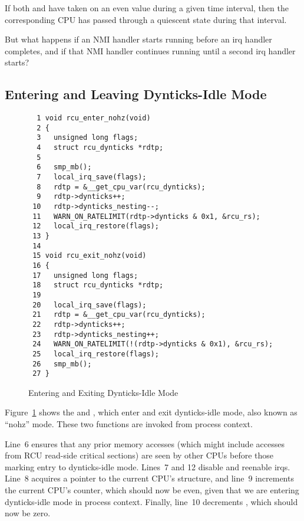 If both  and  have taken on an even
value during a given time interval, then the corresponding CPU has
passed through a quiescent state during that interval.

\QuickQuiz{}
	But what happens if an NMI handler starts running before
	an irq handler completes, and if that NMI handler continues
	running until a second irq handler starts?
 \QuickQuizEnd

\subsection{Entering and Leaving Dynticks-Idle Mode}
\label{app:formal:Entering and Leaving Dynticks-Idle Mode}

\begin{figure}[tbp]
{ \scriptsize
\begin{verbatim}
  1 void rcu_enter_nohz(void)
  2 {
  3   unsigned long flags;
  4   struct rcu_dynticks *rdtp;
  5
  6   smp_mb();
  7   local_irq_save(flags);
  8   rdtp = &__get_cpu_var(rcu_dynticks);
  9   rdtp->dynticks++;
 10   rdtp->dynticks_nesting--;
 11   WARN_ON_RATELIMIT(rdtp->dynticks & 0x1, &rcu_rs);
 12   local_irq_restore(flags);
 13 }
 14
 15 void rcu_exit_nohz(void)
 16 {
 17   unsigned long flags;
 18   struct rcu_dynticks *rdtp;
 19
 20   local_irq_save(flags);
 21   rdtp = &__get_cpu_var(rcu_dynticks);
 22   rdtp->dynticks++;
 23   rdtp->dynticks_nesting++;
 24   WARN_ON_RATELIMIT(!(rdtp->dynticks & 0x1), &rcu_rs);
 25   local_irq_restore(flags);
 26   smp_mb();
 27 }
\end{verbatim}
}
\caption{Entering and Exiting Dynticks-Idle Mode}
\label{fig:app:formal:Entering and Exiting Dynticks-Idle Mode}
\end{figure}

Figure~\ref{fig:app:formal:Entering and Exiting Dynticks-Idle Mode}
shows the  and ,
which enter and exit dynticks-idle mode, also known as ``nohz'' mode.
These two functions are invoked from process context.

Line~6 ensures that any prior memory accesses (which might
include accesses from RCU read-side critical sections) are seen
by other CPUs before those marking entry to dynticks-idle mode.
Lines~7 and 12 disable and reenable irqs.
Line~8 acquires a pointer to the current CPU's 
structure, and
line~9 increments the current CPU's  counter, which
should now be even, given that we are entering dynticks-idle mode
in process context.
Finally, line~10 decrements , which should now be zero.

